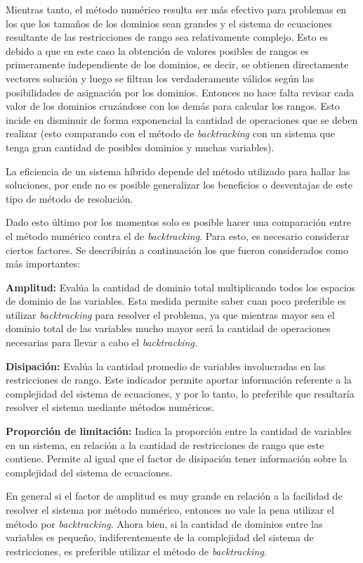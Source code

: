 Mientras tanto, el método numérico resulta ser más efectivo para problemas en
los que los tamaños de los dominios sean grandes y el sistema de ecuaciones
resultante de las restricciones de rango sea relativamente complejo. Esto es
debido a que en este caso la obtención de valores posibles de rangos es
primeramente independiente de los dominios, es decir, se obtienen directamente
vectores solución y luego se filtran los verdaderamente válidos según las
posibilidades de asignación por los dominios. Entonces no hace falta revisar
cada valor de los dominios cruzándose con los demás para calcular los rangos.
Esto incide en disminuir de forma exponencial la cantidad de operaciones que
se deben realizar (esto comparando con el método de \emph{backtracking} con un
sistema que tenga gran cantidad de posibles dominios y muchas variables).

La eficiencia de un sistema híbrido depende del método utilizado para hallar
las soluciones, por ende no es posible generalizar los beneficios o desventajas
de este tipo de método de resolución.

Dado esto último por los momentos solo es posible hacer una comparación entre
el método numérico contra el de \emph{backtracking}. Para esto, es necesario 
considerar ciertos factores. Se describirán a continuación los que
fueron considerados como más importantes:

\textbf{Amplitud:} Evalúa la cantidad de dominio total multiplicando todos los
espacios de dominio de las variables. Esta medida permite saber cuan poco 
preferible es utilizar \emph{backtracking} para resolver el problema, ya que mientras
mayor sea el dominio total de las variables mucho mayor será la cantidad de
operaciones necesarias para llevar a cabo el \emph{backtracking}.

\textbf{Disipación:} Evalúa la cantidad promedio de variables involucradas en
las restricciones de rango. Este indicador permite aportar información
referente a la complejidad del sistema de ecuaciones, y por lo tanto, lo
preferible que resultaría resolver el sistema mediante métodos numéricos.

\textbf{Proporción de limitación:} Indica la proporción entre la cantidad
de variables en un sistema, en relación a la cantidad de restricciones
de rango que este contiene. Permite al igual que el factor de disipación tener
información sobre la complejidad del sistema de ecuaciones.

En general si el factor de amplitud es muy grande en relación a la facilidad
de resolver el sistema por método numérico, entonces no vale la pena utilizar
el método por \emph{backtracking}. Ahora bien, si la cantidad de dominios entre las 
variables es pequeño, indiferentemente de la complejidad del sistema de 
restricciones, es preferible utilizar el método de \emph{backtracking}.
